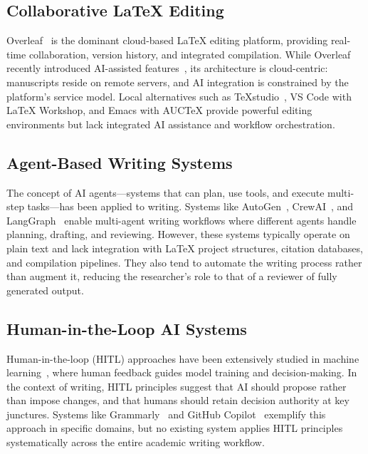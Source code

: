 \documentclass[11pt,a4paper]{article}
\begin{document}
\subsection{Collaborative \LaTeX{} Editing}

Overleaf~\cite{overleaf} is the dominant cloud-based \LaTeX{} editing platform,
providing real-time collaboration, version history, and integrated compilation.
While Overleaf recently introduced AI-assisted features~\cite{overleaf2024ai},
its architecture is cloud-centric: manuscripts reside on remote servers, and AI
integration is constrained by the platform's service model. Local alternatives
such as TeXstudio~\cite{texstudio}, VS Code with \LaTeX{} Workshop, and Emacs
with AUCTeX provide powerful editing environments but lack integrated AI
assistance and workflow orchestration.

\subsection{Agent-Based Writing Systems}

The concept of AI agents---systems that can plan, use tools, and execute
multi-step tasks---has been applied to writing. Systems like
AutoGen~\cite{autogen}, CrewAI~\cite{crewai}, and LangGraph~\cite{langgraph}
enable multi-agent writing workflows where different agents handle planning,
drafting, and reviewing. However, these systems typically operate on plain text
and lack integration with \LaTeX{} project structures, citation databases, and
compilation pipelines. They also tend to automate the writing process rather
than augment it, reducing the researcher's role to that of a reviewer of fully
generated output.

\subsection{Human-in-the-Loop AI Systems}

Human-in-the-loop (HITL) approaches have been extensively studied in machine
learning~\cite{hitl_survey}, where human feedback guides model training and
decision-making. In the context of writing, HITL principles suggest that AI
should propose rather than impose changes, and that humans should retain
decision authority at key junctures. Systems like Grammarly~\cite{grammarly}
and GitHub Copilot~\cite{copilot} exemplify this approach in specific domains,
but no existing system applies HITL principles systematically across the entire
academic writing workflow.
\end{document}
